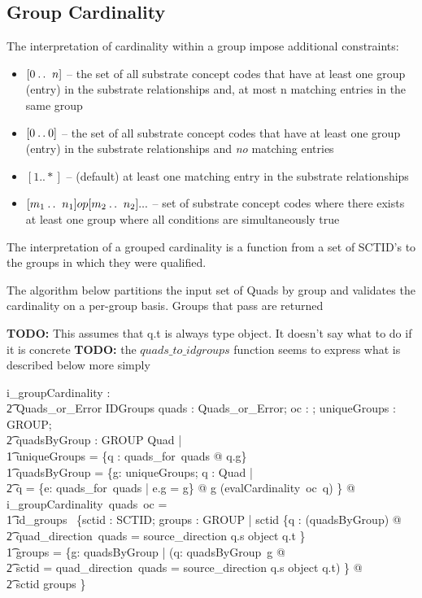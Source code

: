 \documentclass{article}
\begin{document}
\subsection{Group Cardinality}
The interpretation of cardinality within a group impose additional constraints:
\begin{itemize}[noitemsep,nolistsep]
\item{$[0\mathbin{\ldotp\ldotp}~n]$} -- the set of all substrate concept codes that have at least one group (entry) in the substrate relationships and,
at most n matching entries in the same group
\item{$[0\mathbin{\ldotp\ldotp}0]$} -- the set of all substrate concept codes that have at least one group (entry) in the substrate relationships and \emph{no} matching entries 
\item{$[1..*]$} -- (default) at least one matching entry in the substrate relationships
\item{$[m_1\mathbin{\ldotp\ldotp}~n_1] op [m_2\mathbin{\ldotp\ldotp}~n_2] ... $} -- set of substrate concept codes where there exists at least one group where all conditions are simultaneously true
\end{itemize}

The interpretation of a grouped cardinality is a function from a set of SCTID's to the groups in which they were qualified.

The algorithm below partitions the input set of Quads by group and validates the cardinality on a per-group basis.  Groups that
pass are returned

\textbf{TODO:} This assumes that q.t is always type object. It doesn't say what to do if it is concrete
\textbf{TODO:} the $quads\_to\_idgroups$ function seems to express what is described below more simply
\begin{gendef}
   i\_groupCardinality : \\
\t2 Quads\_or\_Error \fun \optional[cardinality] \fun IDGroups
\where
   \forall quads : Quads\_or\_Error; oc : \optional[cardinality]; uniqueGroups : \power GROUP; \\
\t2 quadsByGroup : GROUP \pfun \power Quad |  \\
\t1    uniqueGroups = \{q : quads\_for~quads @ q.g\}  \land \\
\t1    quadsByGroup = \{g: uniqueGroups; q : \power Quad | \\
\t2 q = \{e: quads\_for~quads | e.g = g\}  @ g \mapsto (evalCardinality~oc~q) \} @ \\
i\_groupCardinality~quads~oc = \\
\t1 id\_groups~ \{sctid : SCTID; groups : \power GROUP | sctid \in \{q : \bigcup (\ran quadsByGroup) @ \\
\t2  \IF quad\_direction~quads = source\_direction \THEN q.s \ELSE object \inv q.t \} \land \\
\t1 groups = \{g: \dom quadsByGroup | (\exists q: quadsByGroup~g @ \\
\t2 sctid = \IF quad\_direction~quads = source\_direction \THEN q.s \ELSE object \inv q.t) \} @ \\
\t2 sctid \mapsto groups \}
\end{gendef}
\end{document}
